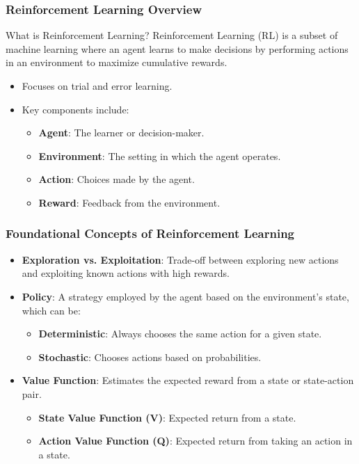 \documentclass[aspectratio=169]{beamer}
\begin{document}
\begin{frame}[fragile]
    \frametitle{Reinforcement Learning Overview}
    \begin{block}{What is Reinforcement Learning?}
        Reinforcement Learning (RL) is a subset of machine learning where an agent learns to make decisions by performing actions in an environment to maximize cumulative rewards.
    \end{block}
    \begin{itemize}
        \item Focuses on trial and error learning.
        \item Key components include:
        \begin{itemize}
            \item \textbf{Agent}: The learner or decision-maker.
            \item \textbf{Environment}: The setting in which the agent operates.
            \item \textbf{Action}: Choices made by the agent.
            \item \textbf{Reward}: Feedback from the environment.
        \end{itemize}
    \end{itemize}
\end{frame}

\begin{frame}[fragile]
    \frametitle{Foundational Concepts of Reinforcement Learning}
    \begin{itemize}
        \item \textbf{Exploration vs. Exploitation}: Trade-off between exploring new actions and exploiting known actions with high rewards.
        \item \textbf{Policy}: A strategy employed by the agent based on the environment's state, which can be:
        \begin{itemize}
            \item \textbf{Deterministic}: Always chooses the same action for a given state.
            \item \textbf{Stochastic}: Chooses actions based on probabilities.
        \end{itemize}
        \item \textbf{Value Function}: Estimates the expected reward from a state or state-action pair.
        \begin{itemize}
            \item \textbf{State Value Function (V)}: Expected return from a state.
            \item \textbf{Action Value Function (Q)}: Expected return from taking an action in a state.
        \end{itemize}
    \end{itemize}
\end{frame}
\end{document}

